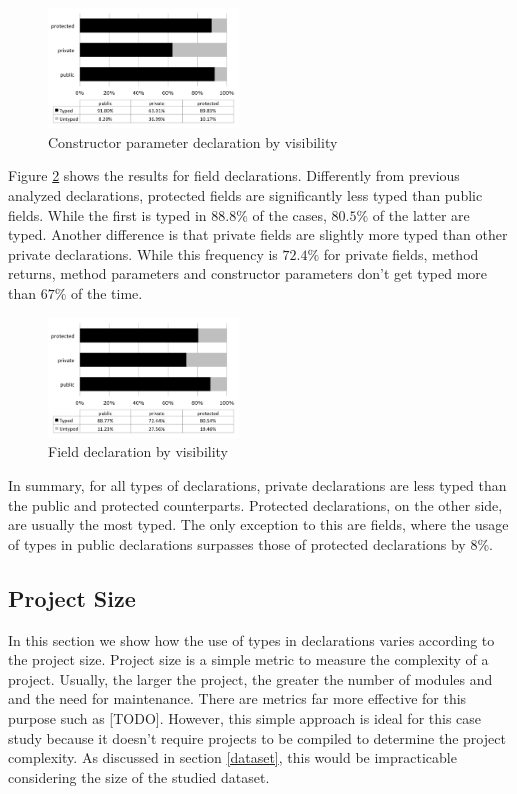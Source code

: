 \documentclass[preprint]{sigplanconf}
\begin{document}
\begin{figure}[ht]
\centering \includegraphics[width=0.45\textwidth]{images/constructor_parameter_visibility} 
\caption{Constructor parameter declaration by visibility}
\label{fig:constructor_parameter_visibility} 
\end{figure}


Figure \ref{fig:field_visibility} shows the results for field declarations. 
Differently from previous analyzed declarations, protected fields are significantly less typed than public fields. 
While the first is typed in $88.8\%$ of the cases, $80.5\%$ of the latter are typed.
Another difference is that private fields are slightly more typed than other private declarations.
While this frequency is $72.4\%$ for private fields, method returns, method parameters and constructor parameters don't get typed more than $67\%$ of the time.


\begin{figure}[ht]
\centering \includegraphics[width=0.45\textwidth]{images/field_visibility} 
\caption{Field declaration by visibility}
\label{fig:field_visibility} 
\end{figure}

In summary, for all types of declarations, private declarations are less typed than the public and protected counterparts.
Protected declarations, on the other side, are usually the most typed. The only exception to this are fields, where the usage of types in public declarations surpasses those of protected declarations by $8\%$.

\subsection{Project Size\label{sub:size-results}}
In this section we show how the use of types in declarations varies according to the project size. 
Project size is a simple metric to measure the complexity of a project.
Usually, the larger the project, the greater the number of modules and and the need for maintenance. 
There are metrics far more effective for this purpose such as [TODO].
However, this simple approach is ideal for this case study because it doesn't require projects to be compiled to determine the project complexity. 
As discussed in section \ref{dataset}, this would be impracticable considering the size of the studied dataset.
\end{document}

